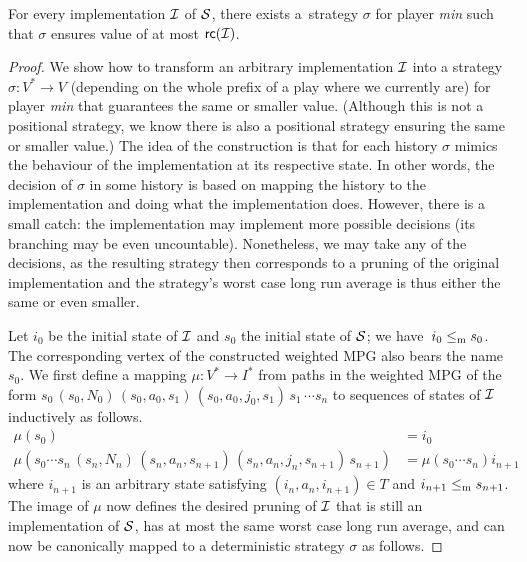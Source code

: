 \begin{lemma}\label{impl2strat}
For every implementation $\mathcal I$ of $\mathcal S$, there exists
a~strategy $\sigma$ for player \emph{min} such that $\sigma$ ensures value of
at most $\mathsf{rc}(\mathcal I)$.
\end{lemma}
\begin{proof}
 We show how to transform an arbitrary implementation $\mathcal I$ into a strategy $\sigma:V^*\to V$ (depending on the whole prefix of a play where we currently are) for player
\emph{min} that guarantees the same or smaller value. (Although this is not a positional
strategy, we know there is also a positional strategy ensuring the same or
smaller value.) The idea of the construction is that for each history $\sigma$ mimics the behaviour of the implementation at its respective state. In other words, the decision of $\sigma$
in some history is based on mapping the history to the implementation and doing
what the implementation does. However, there is a small catch: the implementation may implement more possible decisions (its branching may be even uncountable). Nonetheless, we may take any of the decisions, as the resulting strategy then corresponds to a pruning of the original implementation and the strategy's worst case long run average is thus either the same or even smaller. 

Let $i_0$ be the initial state of $\mathcal I$ and $s_0$ the initial state of
$\mathcal S$; we have~$i_0\le_\mathrm m s_0$. The corresponding vertex of the constructed
weighted MPG also bears the name $s_0$.  We first define a mapping $\mu:V^*\to
I^*$ from paths in the weighted MPG of the form $s_0\, (s_0,N_0)\,
(s_0,a_0,s_1)\, (s_0,a_0,j_0,s_1)\, s_1\, \cdots s_{n}$ to sequences of states
of $\mathcal I$ inductively as follows.
\begin{align*}
 \mu(s_0)&=i_0\\
 \mu(s_0\cdots s_n\, (s_n,N_n)\, (s_n,a_n,s_{n+1})\, (s_n,a_n,j_n,s_{n+1})\, s_{n+1})&=\mu(s_0\cdots s_n)i_{n+1} 
\end{align*}
where $i_{n+1}$ is an arbitrary state satisfying $(i_n,a_n,i_{n+1})\in T$ and
$i_{n+1}\le_\mathrm m s_{n+1}$.  The image of $\mu$ now defines the desired pruning of
$\mathcal I$ that is still an implementation of $\mathcal S$, has at most the same worst
case long run average, and can now be canonically mapped to a deterministic
strategy $\sigma$ as follows.


\end{proof}
